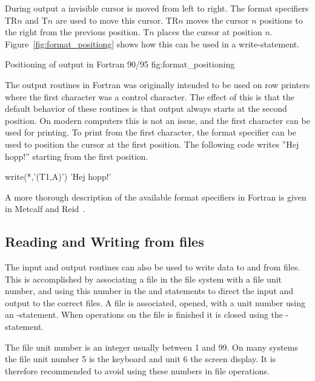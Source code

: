 During output a invisible cursor is moved from left to right. The format specifiers TR$n$ and T$n$ are used to move this cursor. TR$n$ moves the cursor $n$ positions to the right from the previous position. T$n$ places the cursor at position $n$. Figure~\ref{fig:format_positiong} shows how this can be used in a write-statement.

 {Positioning of output in Fortran
90/95} {fig:format_positioning}

The output routines in Fortran was originally intended to be used on row printers where the first character was a control character. The effect of this is that the default behavior of these routines is that output always starts at the second position. On modern computers this is not an issue, and the first character can be used for printing. To print from the first character, the format specifier  can be used to position the cursor at the first position. The following code writes ''Hej hopp!'' starting from the first position.

\begin{fortrancodeenv}
write(*,'(T1,A)') 'Hej hopp!'
\end{fortrancodeenv}

A more thorough description of the available format specifiers in Fortran is given in Metcalf and Reid~\cite{metcalf00}.

\subsection{Reading and Writing from files}

The input and output routines can also be used to write data to and from files. This is accomplished by associating a file in the file system with a file unit number, and using this number in the  and  statements to direct the input and output to the correct files. A file is associated, opened, with a unit number using an -statement. When operations on the file is finished it is closed using the
-statement. 

The file unit number is an integer usually between 1 and 99. On many systems the file unit number 5 is the keyboard and unit 6 the screen display. It is therefore recommended to avoid using these numbers in file operations.

